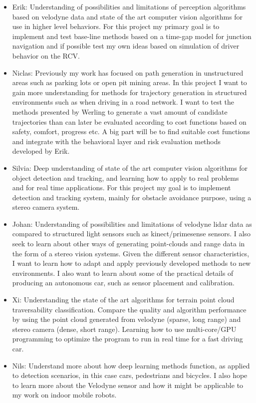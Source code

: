 \documentclass[11pt,a4paper]{article}
\begin{document}
\begin{itemize}
\item 
Erik: Understanding of possibilities and limitations of perception
algorithms based on velodyne data and state of the art computer
vision algorithms for use in higher level behaviors. For this
project my primary goal is to implement and test base-line methods
based on a time-gap model for junction navigation and if possible
test my own ideas based on simulation of driver behavior on the RCV.

\item 
Niclas: Previously my work has focused on path generation in
unstructured areas such as parking lots or open pit mining areas. In
this project I want to gain more understanding for methods for
trajectory generation in structured environments such as when
driving in a road network. I want to test the methods presented by
Werling to generate a vast amount of candidate trajectories than can
later be evaluated according to cost functions based on safety,
comfort, progress etc. A big part will be to find suitable cost
functions and integrate with the behavioral layer and risk
evaluation methods developed by Erik.

\item 
Silvia: Deep understanding of state of the art computer vision algorithms for
object detection and tracking, and learning how to apply to real problems and
for real time applications. For this project my goal is to implement detection
and tracking system, mainly for obstacle avoidance purpose, using a stereo camera system.

\item 
Johan: Understanding of possibilities and limitations of velodyne
lidar data as compared to structured light sensors such as
kinect/primesense sensors. I also seek to learn about other ways of
generating point-clouds and range data in the form of a stereo vision
systems. Given the different sensor characteristics, I want to learn
how to adapt and apply previously developed methods to new
environments. I also want to learn about some of the practical
details of producing an autonomous car, such as sensor placement and
calibration.

\item 
Xi: Understanding the state of the art algorithms for terrain point
cloud traversability classification. Compare the quality and
algorithm performance by using the point cloud generated from
velodyne (sparse, long range) and stereo camera (dense, short
range). Learning how to use multi-core/GPU programming to optimize
the program to run in real time for a fast driving car.

\item 
Nils: Understand more about how deep learning methods function, as applied
to detection scenarios, in this case cars, pedestrians and bicycles.
I also hope to learn more about the Velodyne sensor and how it might
be applicable to my work on indoor mobile robots.

\end{itemize}
\end{document}

